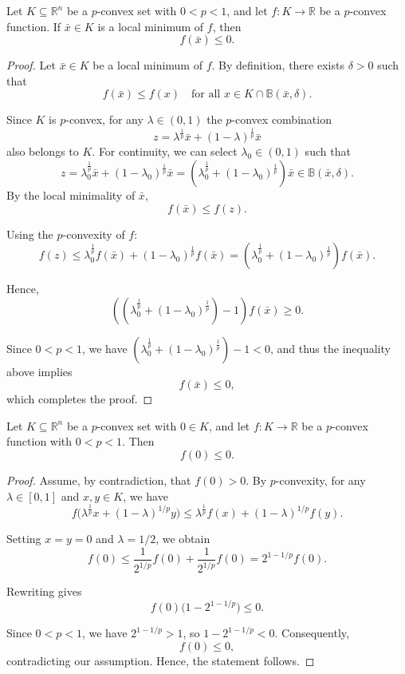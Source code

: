 \documentclass[10pt]{article}
\begin{document}
\begin{theorem}
Let $K \subseteq \mathbb{R}^{n}$ be a $p$-convex set with $0 < p < 1$, and let $f: K \to \mathbb{R}$ be a $p$-convex function. If $\bar{x} \in K$ is a local minimum of $f$, then
\[
f(\bar{x}) \leq 0.
\]
\label{minimo local}
\end{theorem}

\begin{proof}
Let $\bar{x} \in K$ be a local minimum of $f$. By definition, there exists $\delta > 0$ such that
\[
f(\bar{x}) \le f(x) \quad \text{for all } x \in K \cap \mathbb{B}(\bar{x}, \delta).
\]

Since $K$ is $p$-convex, for any $\lambda \in (0,1)$ the $p$-convex combination
\[
z =  \lambda^{\frac{1}{p}} \bar{x} + \left(1 -\lambda\right)^{\frac{1}{p}} \bar{x}
\]
also belongs to $K$. For continuity, we can select $\lambda_{0}\in(0,1)$ such that
\[
z = \lambda^{\frac{1}{p}}_{0} \bar{x} + \left(1 -\lambda_{0}\right)^{\frac{1}{p}} \bar{x} = (\lambda^{\frac{1}{p}}_{0} + \left(1 -\lambda_{0}\right)^{\frac{1}{p}})\bar{x}\in \mathbb{B}(\bar{x}, \delta).\] By the local minimality of $\bar{x}$,
\[
f(\bar{x}) \le f(z).
\]

Using the $p$-convexity of $f$:
\[
f(z) 
\le  \lambda^{\frac{1}{p}}_{0} f(\bar{x}) + \left(1 -\lambda_{0}\right)^{\frac{1}{p}} f(\bar{x})=(\lambda^{\frac{1}{p}}_{0} + \left(1 -\lambda_{0}\right)^{\frac{1}{p}})f(\bar{x}).
\]

Hence,
\[
\left((\lambda^{\frac{1}{p}}_{0} + \left(1 -\lambda_{0}\right)^{\frac{1}{p}})- 1\right) f(\bar{x}) \ge 0.
\]

Since $0 < p < 1$, we have $(\lambda^{\frac{1}{p}}_{0} + \left(1 -\lambda_{0}\right)^{\frac{1}{p}}) - 1 < 0$, and thus the inequality above implies
\[
f(\bar{x}) \le 0,
\]
which completes the proof.
\end{proof}

\begin{theorem}
Let $K \subseteq \mathbb{R}^{n}$ be a $p$-convex set with $0 \in K$, and let $f: K \to \mathbb{R}$ be a $p$-convex function with $0 < p < 1$. Then
\[
f(0) \leq 0.
\]
\label{existence_scalar_minimum}
\end{theorem}

\begin{proof}
Assume, by contradiction, that $f(0) > 0$.  
By $p$-convexity, for any $\lambda \in [0,1]$ and $x,y \in K$, we have
\[
f\big(\lambda^{\frac{1}{p}} x + (1-\lambda)^{1/p} y\big) \leq \lambda^{\frac{1}{p}} f(x) + (1-\lambda)^{1/p} f(y).
\]

Setting $x = y = 0$ and $\lambda = 1/2$, we obtain
\[
f(0) \leq \frac{1}{2^{1/p}} f(0) + \frac{1}{2^{1/p}} f(0) = 2^{1 - 1/p} f(0).
\]

Rewriting gives
\[
f(0) \big(1 - 2^{1 - 1/p}\big) \leq 0.
\]

Since $0 < p < 1$, we have $2^{1 - 1/p} > 1$, so $1 - 2^{1 - 1/p} < 0$. Consequently,
\[
f(0) \leq 0,
\]
contradicting our assumption. Hence, the statement follows.
\end{proof}
\end{document}
